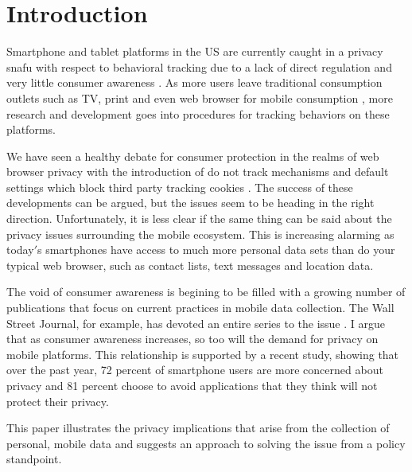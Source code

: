 \section {Introduction}

Smartphone and tablet platforms in the US are currently caught in a privacy snafu with respect to behavioral tracking due to a lack of direct regulation \cite{Priv2013} and very little consumer awareness \cite{Jenn2012}. As more users leave traditional consumption outlets such as TV, print and even web browser for mobile consumption \cite{Abi2012}, more research and development goes into procedures for tracking behaviors on these platforms.

We have seen a healthy debate for consumer protection in the realms of web browser privacy with the introduction of do not track mechanisms \cite{W3C2012} and default settings which block third party tracking cookies \cite{Moz2013}. The success of these developments can be argued, but the issues seem to be heading in the right direction. Unfortunately, it is less clear if the same thing can be said about the privacy issues surrounding the mobile ecosystem. 
This is increasing alarming as today$'$s smartphones have access to much more personal data sets than do your typical web browser, such as contact lists, text messages and location data. 


The void of consumer awareness is begining to be filled with a growing number of publications that focus on current practices in mobile data collection. The Wall Street Journal, for example, has devoted an entire series to the issue \cite{Wsj2013}. I argue that as consumer awareness increases, so too will the demand for privacy on mobile platforms. This relationship is supported by a recent study\cite{Trust2013}, showing that over the past year, 72 percent of smartphone users are more concerned about privacy and 81 percent choose to avoid applications that they think will not protect their privacy. 

This paper illustrates the privacy implications that arise from the collection of personal, mobile data and suggests an approach to solving the issue from a policy standpoint.  

  